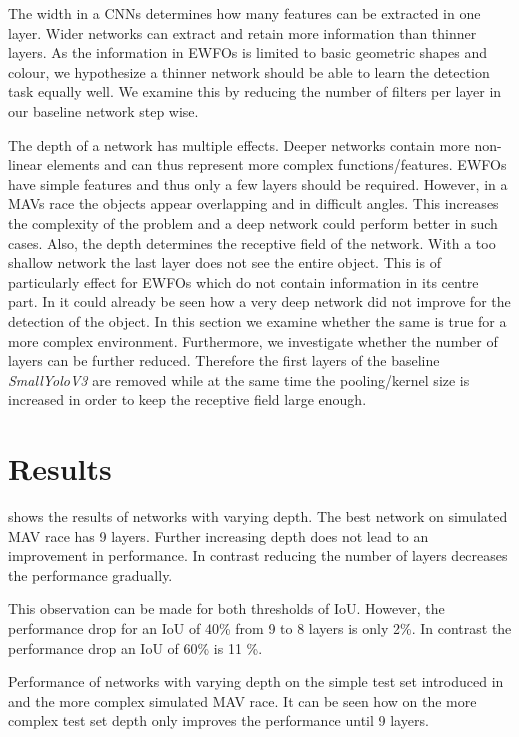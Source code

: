 The width in a \acp{CNN} determines how many features can be extracted in one layer. Wider networks can extract and retain more information than thinner layers. As the information in \acp{EWFO} is limited to basic geometric shapes and colour, we hypothesize a thinner network should be able to learn the detection task equally well. We examine this by reducing the number of filters per layer in our baseline network step wise.

The depth of a network has multiple effects. Deeper networks contain more non-linear elements and can thus represent more complex functions/features. \acp{EWFO} have simple features and thus only a few layers should be required. However, in a \acp{MAV} race the objects appear overlapping and in difficult angles. This increases the complexity of the problem and a deep network could perform better in such cases. Also, the depth determines the receptive field of the network. With a too shallow network the last layer does not see the entire object. This is of particularly effect for \acp{EWFO} which do not contain information in its centre part. In  it could already be seen how a very deep network did not improve for the detection of the object. In this section we examine whether the same is true for a more complex environment. Furthermore, we investigate whether the number of layers can be further reduced. Therefore the first layers of the baseline \textit{SmallYoloV3} are removed while at the same time the pooling/kernel size is increased in order to keep the receptive field large enough.

\section{Results}

 shows the results of networks with varying depth. The best network on simulated \ac{MAV} race has 9 layers. Further increasing depth does not lead to an improvement in performance. In contrast reducing the number of layers decreases the performance gradually.

This observation can be made for both thresholds of \ac{IoU}. However, the performance drop for an \ac{IoU} of 40\% from 9 to 8 layers is only 2\%. In contrast the performance drop an \ac{IoU} of 60\% is 11 \%.

\begin{table}[hbtp]
	\centering
	
	\caption{Performance of networks with varying depth on the simple test set introduced in  and the more complex simulated \ac{MAV} race. It can be seen how on the more complex test set depth only improves the performance until 9 layers.}
	\label{tab:depth}
\end{table}

